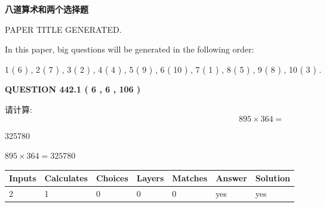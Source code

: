 \documentclass{ctexart}
\begin{document}
   
\vspace{0.2in}
   
   
   
   
   
   
   
   
 \vspace{0.2in}
{\LARGE {\textbf{ 八道算术和两个选择题}}}
   
   
 PAPER TITLE GENERATED.
   
   
   
\vspace{0.2in}
   
In this paper, big questions will be generated in the following order: 
   
   
   1 ( 6 )
 ,
   2 ( 7 )
 ,
   3 ( 2 )
 ,
   4 ( 4 )
 ,
   5 ( 9 )
 ,
   6 ( 10 )
 ,
   7 ( 1 )
 ,
   8 ( 5 )
 ,
   9 ( 8 )
 ,
   10 ( 3 )
 .
  
\vspace{0.2in}
  
{\textbf{\Large{QUESTION
442.1 
 ( 6 , 6 , 106 )
}}}
  
  
 
请计算:
\begin{equation}
895  \times    %
364 = \nonumber
\end{equation}
 
 
 
\noindent{}
 
 

325780
 
 
\noindent{}
 
 

 
 
 
\noindent{}
 
 

$ %
895 \times  %
364=   %
325780$
 
 
\noindent{}
 
 

 
   
   
   
   
\noindent\begin{tabular}{|l|l|l|l|l|l|l|}
 \hline
Inputs & Calculates & Choices & Layers & Matches & Answer & Solution \\ \hline
 2  & 
 1  & 
 0
  & 
 0  & 
 0  & 
  yes & 
  yes 
  \\ \hline
 \end{tabular}
   
\end{document}
